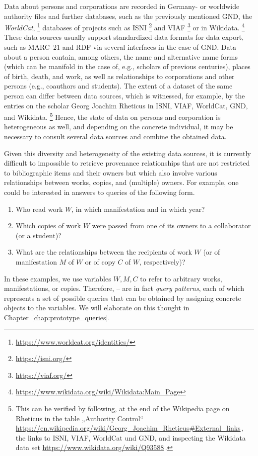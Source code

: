 Data about persons and corporations are recorded
in Germany- or worldwide authority files and further databases,
such as the previously mentioned GND,
the \emph{WorldCat},%
\footnote{\url{https://www.worldcat.org/identities/}}
databases of projects such as ISNI%
\footnote{\url{https://isni.org/}}
and VIAF%
\footnote{\url{https://viaf.org/}}
or in Wikidata.%
\footnote{\url{https://www.wikidata.org/wiki/Wikidata:Main_Page}}
These data sources usually support standardized data formats for data export,
such as MARC~21 and RDF via several interfaces in the case of GND.
Data about a person contain, among others, the name and alternative name forms
(which can be manifold in the case of, e.g., scholars of previous centuries),
places of birth, death, and work,
as well as relationships to corporations and other persons
(e.g., coauthors and students).
The extent of a dataset of the same person can differ between data sources,
which is witnessed, for example, by the entries on the scholar
Georg Joachim Rheticus in ISNI, VIAF, WorldCat, GND, and Wikidata.%
\footnote{%
  This can be verified by following,
  at the end of the Wikipedia page on Rheticus 
  in the table „Authority Control“ \url{https://en.wikipedia.org/wiki/Georg_Joachim_Rheticus\#External_links}\,,
  the links to ISNI, VIAF, WorldCat und GND,
  and inspecting the Wikidata data set
  \url{https://www.wikidata.org/wiki/Q93588}\,.
}
Hence, the state of data on persons and corporation is heterogeneous as well,
and depending on the concrete individual, it may be necessary
to consult several data sources and combine the obtained data.

Given this diversity and heterogeneity of the existing data sources,
it is currently difficult to impossible to retrieve provenance relationships
that are not restricted to bibliographic items and their owners
but which also involve various relationships between works, copies, and (multiple) owners.
For example, one could be interested in answers to queries of the following form.
%
\begin{enumerate}
  \item[\exaquery{1}]
    Who read
    work $W$, in which manifestation and in which year?
  \item[\exaquery{2}]
    Which copies of work $W$ were passed from one of its owners to a collaborator (or a student)?
  \item[\exaquery{3}]
    What are the relationships between the recipients of work $W$
    (or of manifestation $M$ of $W$ or of copy $C$ of $W$, respectively)?
\end{enumerate}
%
In these examples, we use variables $W,M,C$ to refer to arbitrary works,
manifestations, or copies. Therefore, -- are in fact
\emph{query patterns}, each of which represents a set of possible queries
that can be obtained by assigning concrete objects to the variables.
We will elaborate on this thought in Chapter~\ref{chap:prototype_queries}.

